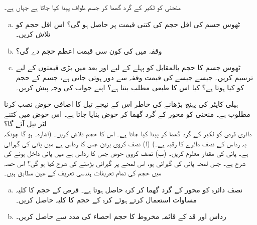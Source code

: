 منحنی  کو لکیر  کے گرد گھما کر جسم طواف پیدا کیا جاتا ہے جہاں  ہے۔
\begin{enumerate}[a.]
\item
ٹھوس جسم کی اقل حجم  کی کتنی قیمت پر حاصل ہو گی؟ اس اقل  حجم کو تلاش کریں۔
\item
وقفہ  میں کی کون سی قیمت  اعظم حجم دے گی؟
\item
ٹھوس جسم کا حجم بالمقابل  کو پہلے  کے لیے اور بعد میں بڑی قیمتوں کے لیے ترسیم کریں۔ جیسے جیسے   کی قیمت وقفہ  سے دور ہوتی جاتی ہے، جسم کے حجم کو کیا ہوتا ہے؟ کیا اس کا طبعی مطلب بنتا ہے؟ اپنے جواب کی وجہ پیش کریں۔
\end{enumerate}
ہیلی کاپٹر کی پہنچ  بڑھانے کی خاطر اس کے نیچے تیل کا اضافی حوض نصب کرنا مطلوب ہے۔ منحنی  کو محور  کے گرد گھما کر حوض بنایا جاتا ہے۔ اس حوض میں کتنے لٹر تیل آئے گا؟
\\
دائری قرص  کو لکیر  کے گرد گھما کر  پیدا کیا جاتا ہے۔ اس کا حجم تلاش کریں۔ (اشارہ۔  ہو گا چونکہ یہ رداس  کے نصف دائرے کا رقبہ ہے۔)
(ا) نصف کروی برتن جس کا رداس  ہے میں پانی کی گہرائی  ہے۔ پانی کی مقدار معلوم کریں۔ (ب) نصف کروی حوض جس کا رداس  ہے میں پانی داخل ہونے کی شرح  ہے۔ جس لمحہ پانی کی گہرائی  ہو، اس لمحے پر گہرائی بڑھنے کی شرح کیا ہو گی؟
اس حصہ میں حجم کی تمام تعریفات ہندسی تعریف کے عین مطابق ہیں۔
\begin{enumerate}[a.]
\item
نصف دائرہ  کو محور  کے گرد گھما کر کرہ حاصل ہوتا ہے۔ قرص کے حجم کا کلیہ مساوات  استعمال کرتے ہوئے کرہ کے حجم کا کلیہ  حاصل کریں۔
\item
رداس  اور قد  کے  قائمہ مخروط کا حجم احصاء کی مدد سے حاصل کریں۔
\end{enumerate}

